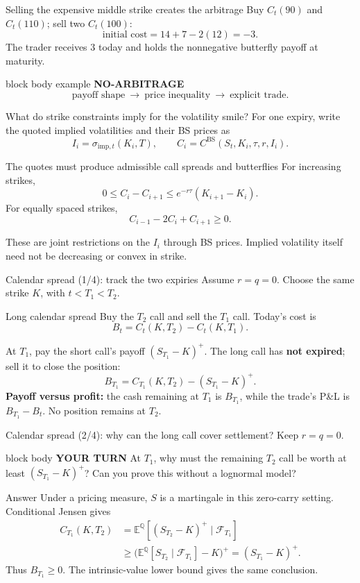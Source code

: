 \documentclass[handout,10pt,aspectratio=169]{beamer}
\newenvironment{marketbox}{\begin{beamercolorbox}[rounded=true,sep=0.7em,wd=\textwidth]{block body example}
  \textbf{\color{CourseGreen}NO-ARBITRAGE}\quad}{\end{beamercolorbox}}
\newenvironment{pausebox}{\begin{beamercolorbox}[rounded=true,sep=0.8em,wd=\textwidth]{block body}
  \textbf{\color{CourseGold}YOUR TURN}\quad}{\end{beamercolorbox}}
\newcommand{\E}{\mathbb E}
\newcommand{\Q}{\mathbb Q}
\newcommand{\cF}{\mathcal F}
\newcommand{\1}{\mathbf 1}
\begin{document}
\begin{frame}{Selling the expensive middle strike creates the arbitrage}
Buy \(C_t(90)\) and \(C_t(110)\); sell two \(C_t(100)\):
\[
\text{initial cost}=14+7-2(12)=\boxed{-3}.
\]
The trader receives \(3\) today and holds the nonnegative butterfly payoff
at maturity.
\begin{marketbox}
\[
\text{payoff shape}\ \longrightarrow\ \text{price inequality}\ \longrightarrow\ \text{explicit trade}.
\]
\end{marketbox}
\end{frame}

\begin{frame}{What do strike constraints imply for the volatility smile?}
For one expiry, write the quoted implied volatilities and their BS prices as
\[
I_i=\sigma_{\mathrm{imp},t}(K_i,T),\qquad
C_i=C^{\mathrm{BS}}(S_t,K_i,\tau,r,I_i).
\]
\begin{block}{The quotes must produce admissible call spreads and butterflies}
For increasing strikes,
\[
\boxed{0\le C_i-C_{i+1}\le e^{-r\tau}(K_{i+1}-K_i).}
\]
For equally spaced strikes,
\[
\boxed{C_{i-1}-2C_i+C_{i+1}\ge0.}
\]
\end{block}
These are joint restrictions on the \(I_i\) through BS prices.
Implied volatility itself need not be decreasing or convex in strike.
\end{frame}

\begin{frame}{Calendar spread (1/4): track the two expiries}
Assume \(r=q=0\). Choose the same strike \(K\), with \(t<T_1<T_2\).
\begin{block}{Long calendar spread}
Buy the \(T_2\) call and sell the \(T_1\) call. Today's cost is
\[
B_t=C_t(K,T_2)-C_t(K,T_1).
\]
\end{block}
At \(T_1\), pay the short call's payoff \((S_{T_1}-K)^+\).
The long call has \textbf{not expired}; sell it to close the position:
\[
\boxed{B_{T_1}=C_{T_1}(K,T_2)-(S_{T_1}-K)^+.}
\]
\textbf{Payoff versus profit:} the cash remaining at \(T_1\) is \(B_{T_1}\),
while the trade's P\&L is \(B_{T_1}-B_t\). No position remains at \(T_2\).
\end{frame}

\begin{frame}{Calendar spread (2/4): why can the long call cover settlement?}
Keep \(r=q=0\).
\begin{pausebox}
At \(T_1\), why must the remaining \(T_2\) call be worth at least
\((S_{T_1}-K)^+\)? Can you prove this without a lognormal model?
\end{pausebox}

\begin{exampleblock}{Answer}
Under a pricing measure, \(S\) is a martingale in this zero-carry setting.
Conditional Jensen gives
\[
\begin{aligned}
C_{T_1}(K,T_2)
&=\E^{\Q}[(S_{T_2}-K)^+\mid\cF_{T_1}]\\
&\ge\bigl(\E^{\Q}[S_{T_2}\mid\cF_{T_1}]-K\bigr)^+
=(S_{T_1}-K)^+.
\end{aligned}
\]
Thus \(B_{T_1}\ge0\). The intrinsic-value lower bound gives the same conclusion.
\end{exampleblock}
\end{frame}
\end{document}
